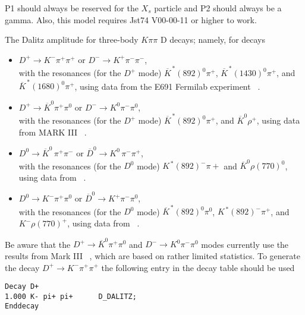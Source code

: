 \Notes
P1 should always be reserved for the $X_{s}$ particle and P2 should
always be a gamma. Also, this model requires Jst74 V00-00-11 or higher 
to work. \\


\label{dplusdalitz}



\Expl
The Dalitz amplitude for three-body $K \pi \pi$ D decays; namely, for decays 
\begin{itemize}
\item
$D^+\rightarrow K^- \pi^+ \pi^+$ or $D^-\rightarrow K^+ \pi^- \pi^-$,\\
with the resonances (for the $D^{+}$ mode) $\overline{K}^{\,\ast}(892)^{0}\pi^{+}$, $\overline{K}^{\,\ast}(1430)^{0}\pi^{+}$, and $\overline{K}^{\,\ast}(1680)^{0}\pi^{+}$, using data from the E691 Fermilab experiment ~\cite{Anjos93}.
\item
$D^+\rightarrow \overline{K}^{0} \pi^+ \pi^0$ or $D^-\rightarrow K^0 \pi^- \pi^0$,\\
with the resonances (for the $D^{+}$ mode) $\overline{K}^{\,\ast}(892)^{0}\pi^{+}$, and $\overline{K}^{0}\rho^{+}$, using data from MARK III ~\cite{Adler87}. 
\item
$D^0\rightarrow \overline{K}^0\, \pi^+ \pi^-$ or $\overline{D}^0\rightarrow K^0\, \pi^- \pi^+$,\\
with the resonances (for the $D^{0}$ mode) $K^{\,\ast}(892)^{-} \pi{+}$ and $\overline{K}^{0} \rho(770)^{0}$, using data from ~\cite{Anjos93}. 
\item
$D^0\rightarrow K^{-} \pi^+ \pi^0$ or $\overline{D}^0\rightarrow K^+ \pi^- \pi^0$,\\
with the resonances (for the $D^{0}$ mode) $\overline{K}^{\,\ast}(892)^{0}\pi^{0}$, $K^{\,\ast}(892)^{-}\pi^{+}$, and $K^{-}\rho(770)^{+}$, using data from ~\cite{Anjos93}. 
\end{itemize}

Be aware that the $D^+\rightarrow \overline{K}^{0} \pi^+ \pi^0$ and $D^-\rightarrow K^0 \pi^- \pi^0$ modes currently use the results from Mark III ~\cite{Adler87}, which are based on rather limited statistics.    
\Example
To generate the decay $D^+\rightarrow K^- \pi^+ \pi^+$ the 
following entry in the decay table should be used
\begin{verbatim}
Decay D+
1.000 K- pi+ pi+      D_DALITZ;
Enddecay
\end{verbatim}


